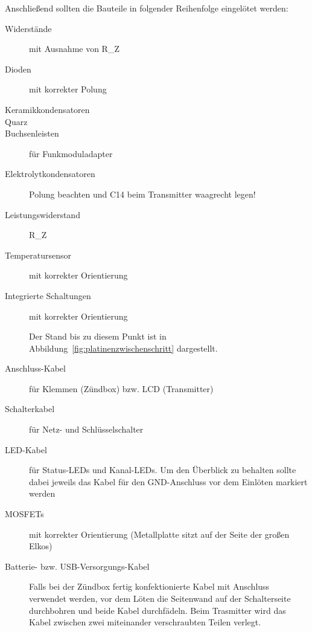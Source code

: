 \documentclass[paper=a4, parskip, numbers=noenddot, toc=listof, headsepline]{scrbook}
\begin{document}
					Anschließend sollten die Bauteile in folgender Reihenfolge eingelötet werden:
					\begin{description}
						\item[Widerstände] mit Ausnahme von R\_Z
						\item[Dioden] mit korrekter Polung
						\item[Keramikkondensatoren]
						\item[Quarz]
						\item[Buchsenleisten] für Funkmoduladapter
						\item[Elektrolytkondensatoren] Polung beachten und C14 beim Transmitter waagrecht legen!
						\item[Leistungswiderstand] R\_Z
						\item[Temperatursensor] mit korrekter Orientierung
						\item[Integrierte Schaltungen] mit korrekter Orientierung
								\begin{center}
									Der Stand bis zu diesem Punkt ist in Abbildung~\ref{fig:platinenzwischenschritt} dargestellt.
								\end{center}
						\item[Anschluss-Kabel] für Klemmen (Zündbox) bzw. LCD (Transmitter)
						\item[Schalterkabel] für Netz- und Schlüsselschalter
						\item[LED-Kabel] für Status-LEDs und Kanal-LEDs. Um den Überblick zu behalten sollte dabei jeweils das Kabel für den GND-Anschluss vor dem Einlöten markiert werden
						\item[MOSFETs] mit korrekter Orientierung (Metallplatte sitzt auf der Seite der großen Elkos)
						\item[Batterie- bzw. USB-Versorgungs-Kabel] Falls bei der Zündbox fertig konfektionierte Kabel mit Anschluss verwendet werden, vor dem Löten die Seitenwand auf der Schalterseite durchbohren und beide Kabel durchfädeln. Beim Trasmitter wird das Kabel zwischen zwei miteinander verschraubten Teilen verlegt.
					\end{description}
\end{document}
